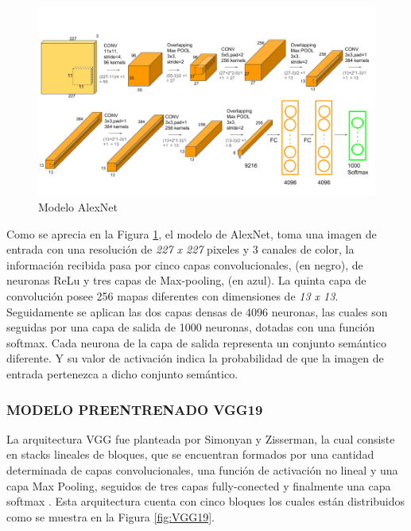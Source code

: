 \begin{figure}[ht]
	\centering
	\includegraphics[scale=0.4]{Figs/5.png}
	\caption{Modelo AlexNet}
	\label{fig:AlexNet}
\end{figure}

Como se aprecia en la Figura \ref{fig:AlexNet}, el modelo de AlexNet, toma una imagen de entrada con una resolución de \textit{227 x 227} pixeles y 3 canales de color, la información recibida pasa por cinco capas convolucionales, (en negro), de neuronas ReLu y tres capas de Max-pooling, (en azul). La quinta capa de convolución posee 256 mapas diferentes con dimensiones de \textit{13 x 13}. Seguidamente se aplican las dos capas densas de 4096 neuronas, las cuales son seguidas por una capa de salida de 1000 neuronas, dotadas con una función softmax. Cada neurona de la capa de salida representa un conjunto semántico diferente. Y su valor de activación indica la probabilidad de que la imagen de entrada pertenezca a dicho conjunto semántico.\\


\subsubsection{\MakeUppercase{Modelo preentrenado VGG19}}

La arquitectura VGG fue planteada por Simonyan y Zisserman, la cual consiste en stacks lineales de bloques, que se encuentran formados por una cantidad determinada de capas convolucionales, una función de activación no lineal y una capa Max Pooling, seguidos de tres capas fully-conected y finalmente una capa softmax \cite{ref_2}. Esta arquitectura cuenta con cinco bloques los cuales están distribuidos como se muestra en la Figura \ref{fig:VGG19}.				

